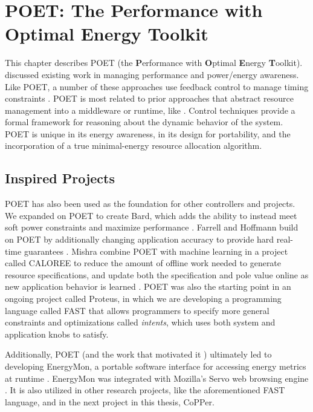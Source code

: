 \chapter{POET: The Performance with Optimal Energy Toolkit}
\label{sec:poet}

This chapter describes POET (the \textbf{P}erformance with \textbf{O}ptimal \textbf{E}nergy \textbf{T}oolkit).
 discussed existing work in managing performance and power/energy awareness.
Like POET, a number of these approaches use feedback control to manage timing constraints \cite{Agilos,Bertini2007,grace2,CoAdapt,Maggio13,TCST,ControlWare,PTRADE,Fu2012,Li2007}.
POET is most related to prior approaches that abstract resource management into a middleware or runtime, like \cite{ControlWare,Sojka,PTRADE,Rajkumar}.
Control techniques provide a formal framework for reasoning about the dynamic behavior of the system.
POET is unique in its energy awareness, in its design for portability, and the incorporation of a true minimal-energy resource allocation algorithm.









\section{Inspired Projects}
\label{sec:poet-inspired}


POET has also been used as the foundation for other controllers and projects.
We expanded on POET to create Bard, which adds the ability to instead meet soft power constraints and maximize performance \cite{Bard}.
Farrell and Hoffmann build on POET by additionally changing application accuracy to provide hard real-time guarantees \cite{meantime}.
Mishra \etal combine POET with machine learning in a project called CALOREE to reduce the amount of offline work needed to generate resource specifications, and update both the specification and pole value online as new application behavior is learned \cite{CALOREE}.
POET was also the starting point in an ongoing project called Proteus, in which we are developing a programming language called FAST that allows programmers to specify more general constraints and optimizations called \emph{intents}, which uses both system and application knobs to satisfy.

Additionally, POET (and the work that motivated it \cite{Imes2014}) ultimately led to developing EnergyMon, a portable software interface for accessing energy metrics at runtime \cite{energymon}.
EnergyMon was integrated with Mozilla's Servo web browsing engine \cite{servo}.
It is also utilized in other research projects, like the aforementioned FAST language, and in the next project in this thesis, CoPPer.
